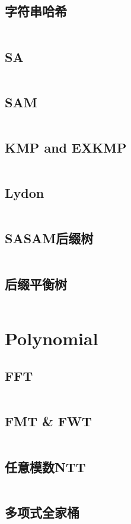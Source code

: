 \documentclass[titlepage, a4paper]{article}
\begin{document}
\begin{multicols}{2}
\begin{spacing}{0.6}
				\subsection{字符串哈希}
					\inputminted{cpp}{src/String/MultipleHash.cpp}
				\subsection{SA}
					\inputminted{cpp}{src/String/SA.cpp}
				\subsection{SAM}
					\inputminted{cpp}{src/String/SAM.cpp}
				\subsection{KMP and EXKMP}
					\inputminted{cpp}{src/String/KMPexKMP.cpp}
				\subsection{Lydon}
					\inputminted{cpp}{src/String/LydonWordDecomposition.cpp}
				\subsection{SASAM后缀树}
					\inputminted{cpp}{src/String/SASAM后缀树.cpp}
				\subsection{后缀平衡树}
					\inputminted{cpp}{src/String/后缀平衡树.cpp}
			\section{Polynomial}
				\subsection{FFT}
					\inputminted{cpp}{src/Math Polynomial/FFT.cpp}
				\subsection{FMT \& FWT}
					\inputminted{cpp}{src/Math Polynomial/FWT.cpp}
				\subsection{任意模数NTT}
					\inputminted{cpp}{src/Math Polynomial/任意模数多项式乘法.cpp}
				\subsection{多项式全家桶}
					\inputminted{cpp}{src/Math Polynomial/poly.cpp}

\end{spacing}
\end{multicols}
\end{document}
